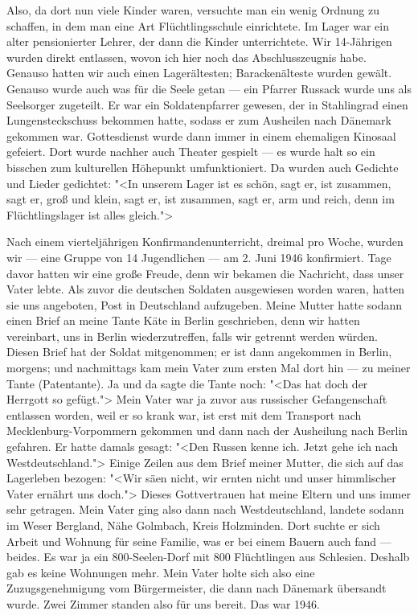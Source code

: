 \documentclass[12pt, twoside]{book}
\begin{document}
Also, da dort nun viele Kinder waren, versuchte man ein wenig Ordnung zu schaffen, in dem man eine Art Flüchtlingsschule einrichtete.
Im Lager war ein alter pensionierter Lehrer, der dann die Kinder unterrichtete. Wir 14-Jährigen wurden direkt entlassen, wovon ich hier noch das 
Abschlusszeugnis habe. Genauso hatten wir auch einen Lagerältesten; Barackenälteste wurden gewält. Genauso wurde auch was für die Seele getan --- 
ein Pfarrer Russack wurde uns als Seelsorger zugeteilt. Er war ein Soldatenpfarrer gewesen, der in Stahlingrad einen Lungensteckschuss bekommen hatte, sodass er zum Ausheilen nach Dänemark gekommen war.
Gottesdienst wurde dann immer in einem ehemaligen Kinosaal gefeiert. Dort wurde nachher auch Theater gespielt --- es wurde halt so ein bisschen zum kulturellen Höhepunkt umfunktioniert.
Da wurden auch Gedichte und Lieder gedichtet:
"<In unserem Lager ist es schön, sagt er, ist zusammen, sagt er, groß und klein, sagt er, ist zusammen, sagt er, arm und reich, denn im Flüchtlingslager ist alles gleich.">

Nach einem vierteljährigen Konfirmandenunterricht, dreimal pro Woche, wurden wir --- eine Gruppe von 14 Jugendlichen --- am 2. Juni 1946 konfirmiert.
Tage davor hatten wir eine große Freude, denn wir bekamen die Nachricht, dass unser Vater lebte. Als zuvor die deutschen Soldaten ausgewiesen worden waren, hatten sie uns angeboten, Post in Deutschland aufzugeben.
Meine Mutter hatte sodann einen Brief an meine Tante Käte in Berlin geschrieben, denn wir hatten vereinbart, uns in Berlin wiederzutreffen, falls wir getrennt werden würden.
Diesen Brief hat der Soldat mitgenommen; er ist dann angekommen in Berlin, morgens; und nachmittags kam mein Vater zum ersten Mal dort hin --- zu meiner Tante (Patentante).
Ja und da sagte die Tante noch: "<Das hat doch der Herrgott so gefügt.">
Mein Vater war ja zuvor aus russischer Gefangenschaft entlassen worden, weil er so krank war, ist erst mit dem Transport nach Mecklenburg-Vorpommern gekommen und dann nach der Ausheilung nach Berlin gefahren.
Er hatte damals gesagt: "<Den Russen kenne ich. Jetzt gehe ich nach Westdeutschland.">
Einige Zeilen aus dem Brief meiner Mutter, die sich auf das Lagerleben bezogen: "<Wir säen nicht, wir ernten nicht und unser himmlischer Vater ernährt uns doch.">
Dieses Gottvertrauen hat meine Eltern und uns immer sehr getragen. Mein Vater ging also dann nach Westdeutschland, landete sodann im Weser Bergland, Nähe Golmbach, Kreis Holzminden. Dort suchte er sich Arbeit und
Wohnung für seine Familie, was er bei einem Bauern auch fand --- beides. Es war ja ein 800-Seelen-Dorf  mit 800 Flüchtlingen aus Schlesien. Deshalb gab es keine Wohnungen mehr.
Mein Vater holte sich also eine Zuzugsgenehmigung vom Bürgermeister, die dann nach Dänemark übersandt wurde. Zwei Zimmer standen also für uns bereit. Das war 1946.
\end{document}
